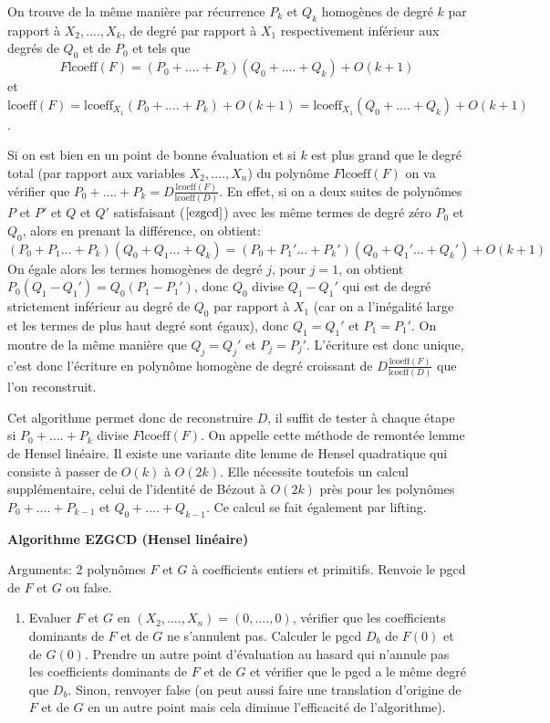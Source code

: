 \documentclass[a4paper,11pt]{article}
\begin{document}
\begin{giacjshere}
On trouve de la même manière par récurrence $P_k$ et $Q_k$ homogènes de degré
$k$ par rapport à $X_2, \ldots ., X_k$, de degré par rapport à $X_1$
respectivement inférieur aux degrés de $Q_0$ et de $P_0$ et tels que
\begin{equation}
  F \mbox{lcoeff} ( F ) = ( P_0 + \ldots . + P_k ) ( Q_0 + \ldots . + Q_k ) +
  O ( k + 1  ) \label{ezgcd}
\end{equation}
et $\mbox{lcoeff} ( F ) = \mbox{lcoeff}_{X_1} ( P_0 + \ldots . + P_k ) + O ( k
+ 1 ) = \mbox{lcoeff}_{X_1} ( Q_0 + \ldots . + Q_k ) + O ( k + 1 )$.

Si on est bien en un point de bonne évaluation et si $k$ est plus grand que le
degré total (par rapport aux variables $X_2, \ldots ., X_n$) du polynôme
 $F \mbox{lcoeff} ( F )$ on va vérifier que $P_0 + \ldots . + P_k = D
\frac{\mbox{lcoeff} ( F )}{\mbox{lcoeff} ( D )}$. En effet, si on a deux
suites de polynômes $P$ et $P'$ et $Q$ et $Q'$ satisfaisant (\(\ref{ezgcd}\)) avec
les même termes de degré zéro $P_0$ et $Q_0$, alors en prenant la différence,
on obtient:
\[ ( P_0 + P_1 \ldots  + P_k ) ( Q_0 + Q_1 \ldots  + Q_k ) = ( P_0 + P_1'
   \ldots  + P_k' ) ( Q_0 + Q_1' \ldots  + Q_k' ) + O ( k + 1 ) \]
On égale alors les termes homogènes de degré $j$, pour $j = 1$, on obtient
$P_0 ( Q_1 - Q_1' ) = Q_0 ( P_1 - P_1' )$, donc $Q_0$ divise $Q_1 - Q_1'$ qui
est de degré strictement inférieur au degré de $Q_0$ par rapport à $X_1$ (car
on a l'inégalité large et les termes de plus haut degré sont égaux),
donc $Q_1 = Q_1'$ et $P_1 = P_1'$. On montre de la même manière que $Q_j =
Q_j'$ et $P_j = P_j'$. L'écriture est donc unique, c'est donc l'écriture en
polynôme homogène de degré croissant de $D \frac{\mbox{lcoeff} ( F
)}{\mbox{lcoeff} ( D )}$ que l'on reconstruit.

Cet algorithme permet donc de reconstruire $D$, il suffit de tester à chaque
étape si $P_0 + \ldots . + P_k$ divise $F \mbox{lcoeff} ( F )$. On appelle
cette méthode de remontée lemme de Hensel linéaire. Il existe une variante
dite lemme de Hensel quadratique qui consiste à passer de $O ( k )$ à $O ( 2 k
)$. Elle nécessite toutefois un calcul supplémentaire, celui de l'identité de
Bézout à $O ( 2 k )$ près pour les polynômes $P_0 + \ldots . + P_{k - 1}$ et
$Q_0 + \ldots . + Q_{k - 1}$. Ce calcul se fait également par lifting.

{\bf{Algorithme EZGCD (Hensel linéaire)}}

Arguments: 2 polynômes $F$ et $G$ à coefficients entiers et primitifs. Renvoie
le pgcd de $F$ et $G$ ou false.
\begin{enumerate}
  \item Evaluer $F$ et $G$ en $( X_2, \ldots ., X_n ) = ( 0, \ldots ., 0 )$,
  vérifier que les coefficients dominants de $F$ et de $G$ ne s'annulent pas.
  Calculer le pgcd $D_b$ de $F ( 0 )$ et de $G ( 0 )$. Prendre un autre point
  d'évaluation au hasard qui n'annule pas les coefficients dominants de $F$ et
  de $G$ et vérifier que le pgcd a le même degré que $D_b$. Sinon, renvoyer
  false (on peut aussi faire une translation d'origine de $F$ et de $G$ en un
  autre point mais cela diminue l'efficacité de l'algorithme).
  

\end{enumerate}
\end{giacjshere}
\end{document}
